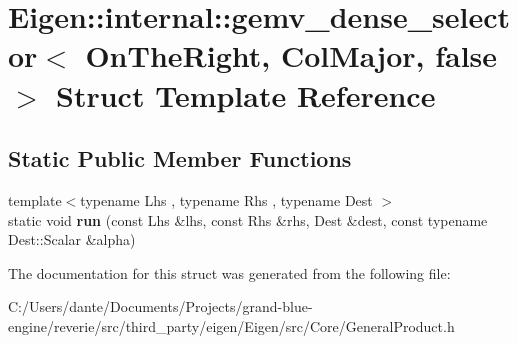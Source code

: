 \hypertarget{struct_eigen_1_1internal_1_1gemv__dense__selector_3_01_on_the_right_00_01_col_major_00_01false_01_4}{}\section{Eigen\+::internal\+::gemv\+\_\+dense\+\_\+selector$<$ On\+The\+Right, Col\+Major, false $>$ Struct Template Reference}
\label{struct_eigen_1_1internal_1_1gemv__dense__selector_3_01_on_the_right_00_01_col_major_00_01false_01_4}
\subsection*{Static Public Member Functions}
\begin{DoxyCompactItemize}
\item 
\mbox{\label{struct_eigen_1_1internal_1_1gemv__dense__selector_3_01_on_the_right_00_01_col_major_00_01false_01_4_ae84f031ab7c0cf40c2feeb663e0e9cdc}} 
{\footnotesize template$<$typename Lhs , typename Rhs , typename Dest $>$ }\\static void {\bfseries run} (const Lhs \&lhs, const Rhs \&rhs, Dest \&dest, const typename Dest\+::\+Scalar \&alpha)
\end{DoxyCompactItemize}


The documentation for this struct was generated from the following file\+:\begin{DoxyCompactItemize}
\item 
C\+:/\+Users/dante/\+Documents/\+Projects/grand-\/blue-\/engine/reverie/src/third\+\_\+party/eigen/\+Eigen/src/\+Core/General\+Product.\+h\end{DoxyCompactItemize}

